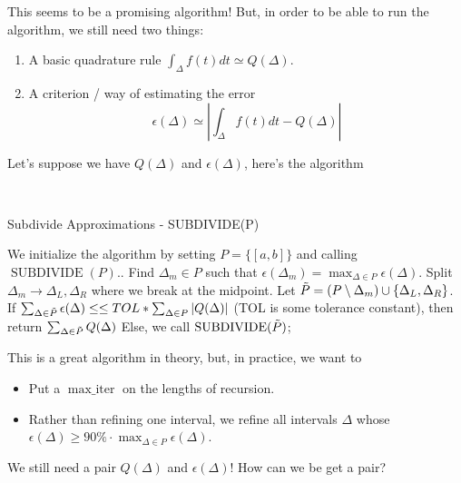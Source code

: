 \documentclass{article}
\begin{document}
This seems to be a promising algorithm! But, in order to be able to run the algorithm, we still need two things:
\begin{enumerate}
    \item A basic quadrature rule $\int_\Delta f(t) dt \simeq Q(\Delta)$.
    \item A criterion / way of estimating the error
    \[\epsilon(\Delta) \simeq |\int_\Delta f(t) dt - Q(\Delta) |\]
\end{enumerate}

Let's suppose we have $Q(\Delta)$ and $\epsilon(\Delta)$, here's the algorithm

\begin{tcolorbox}[standard jigsaw,opacityback=0]\\
\begin{algorithm}[H]
\caption{Subdivide Approximations - SUBDIVIDE(P)}
We initialize the algorithm by setting $P = \{[a, b]\}$ and calling $\operatorname{SUBDIVIDE}(P)$.. Find $\Delta_m \in P$ such that $\epsilon(\Delta_m) = \max_{\Delta \in P} \epsilon(\Delta)$. Split $\Delta_m \to \Delta_L, \Delta_R$ where we break at the midpoint. Let $\Tilde{P} = (P \setminus \Delta_m) \cup \{\Delta_L, \Delta_R\}$. If $\sum_{\Delta \in \Tilde{P}} \epsilon(\Delta) \leq \leq TOL * \sum_{\Delta \in P} |Q(\Delta)|$ (TOL is some tolerance constant), then return $\sum_{\Delta \in \Tilde{P}} Q(\Delta)$\; Else, we call $\operatorname{SUBDIVIDE}(\Tilde{P})$;
\end{algorithm}
\end{tcolorbox}

This is a great algorithm in theory, but, in practice, we want to
\begin{itemize}
    \item Put a $\operatorname{max\_iter}$ on the lengths of recursion.
    \item Rather than refining one interval, we refine all intervals $\Delta$ whose $\epsilon(\Delta) \geq 90\% \cdot \max_{\Delta \in P} \epsilon(\Delta)$. 
\end{itemize}

\begin{question}
    We still need a pair $Q(\Delta)$ and $\epsilon(\Delta)$! How can we be get a pair?
\end{question}
\end{document}

